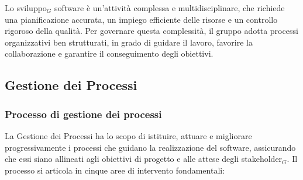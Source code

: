 \documentclass[a4paper, 10pt]{article}
\begin{document}
Lo sviluppo$_G$ software è un'attività complessa e multidisciplinare, che richiede una pianificazione accurata, un impiego efficiente delle risorse e un controllo rigoroso della qualità. Per governare questa complessità, il gruppo adotta processi organizzativi ben strutturati, in grado di guidare il lavoro, favorire la collaborazione e garantire il conseguimento degli obiettivi.

\subsection{Gestione dei Processi}
\label{subsec:gestione_processi}

\subsubsection{Processo di gestione dei processi}
\label{subsubsec:processo_gestione}

La Gestione dei Processi ha lo scopo di istituire, attuare e migliorare progressivamente i processi che guidano la realizzazione del software, assicurando che essi siano allineati agli obiettivi di progetto e alle attese degli stakeholder$_G$. Il processo si articola in cinque aree di intervento fondamentali:
\end{document}
